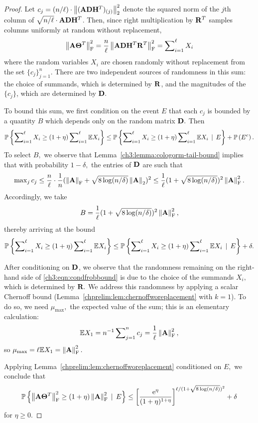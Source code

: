 \begin{proof}
Let $c_j = (n/\ell)\cdot\left\|(\mathbf{A} \mathbf{D} \mathbf{H}^T)_{(j)}\right\|_2^2$ denote the 
squared norm of the $j$th column of 
$\sqrt{n/\ell} \cdot \mathbf{A} \mathbf{D} \mathbf{H}^T$. Then, since right multiplication 
by $\mathbf{R}^T$ samples columns uniformly at random without replacement,
%
\begin{equation}
\label{ch3:eqn:frobenius-norm-upperbound}
 \left\|\mathbf{A} \mathbf{\Theta}^T\right\|_\mathrm{F}^2 = \frac{n}{\ell} 
 \left\|\mathbf{A} \mathbf{D} \mathbf{H}^T \mathbf{R}^T \right\|_\mathrm{F}^2 = \sum\nolimits_{i=1}^\ell X_i
\end{equation}
%
where the random variables $X_i$ are chosen randomly without replacement from
the set $\{c_j\}_{j=1}^n.$ There are two independent sources of randomness in
this sum: the choice of summands, which is determined by $\mathbf{R}$, and the 
magnitudes of the $\{c_j\}$, which are determined by $\mathbf{D}.$

To bound this sum, we first condition on the event $E$ that each $c_j$ is
bounded by a quantity $B$ which depends only on the random matrix $\mathbf{D}.$ Then
\[
\mathbb{P}\left\{\sum\nolimits_{i=1}^\ell X_i \geq (1 + \eta) \sum\nolimits_{i=1}^\ell 
\mathbb{E}{X_i} \right\} \leq \mathbb{P}\left\{\sum\nolimits_{i=1}^\ell X_i \geq (1 + \eta) \sum\nolimits_{i=1}^\ell \mathbb{E}{X_i} \,\mid\, E\right\} + \mbox{}{\mathbb{P}}\left(E^c\right).
\]
To select $B,$ we observe that Lemma~\ref{ch3:lemma:cologorm-tail-bound} 
implies that with probability $1 - \delta,$ the entries of $\mathbf{D}$ are such 
that
\[
 \max\nolimits_j c_j \leq \frac{n}{\ell} \cdot \frac{1}{n} 
 (\left\|\mathbf{A}\right\|_\mathrm{F} + \sqrt{8 \log(n/\delta)} \left\|\mathbf{A}\right\|_2)^2 \leq  
 \frac{1}{\ell} (1 + \sqrt{8 \log(n/\delta)})^2 \left\|\mathbf{A}\right\|_\mathrm{F}^2.
\]
Accordingly, we take
\[
 B = \frac{1}{\ell}(1 + \sqrt{8 \log(n/\delta)})^2 \left\|\mathbf{A}\right\|_\mathrm{F}^2,
\]
thereby arriving at the bound
\begin{equation}
\label{ch3:eqn:condfrobbound}
\mathbb{P}\left\{\sum\nolimits_{i=1}^\ell X_i \geq 
   (1 + \eta) \sum\nolimits_{i=1}^\ell \mathbb{E}{X_i} \right\} \leq 
   \mathbb{P}\left\{\sum\nolimits_{i=1}^\ell X_i \geq 
   (1 + \eta) \sum\nolimits_{i=1}^\ell \mathbb{E}{X_i} \,\mid\, E\right\} + \delta.
\end{equation}

After conditioning on $\mathbf{D}$, we observe that the randomness remaining on 
the right-hand side of \eqref{ch3:eqn:condfrobbound} is due to the choice of the 
summands $X_i,$ which is determined by $\mathbf{R}.$ We address this randomness by
applying a scalar Chernoff bound 
(Lemma~\ref{chprelim:lem:chernoffworeplacement} with $k=1$). To do so, we need 
$\mu_{\text{max}},$ the expected value of the sum; this is an elementary 
calculation:
\[
 \mathbb{E}{X_1} = n^{-1} \sum\nolimits_{j=1}^n c_j = \frac{1}{\ell} \left\|\mathbf{A}\right\|_\mathrm{F}^2,
\]
so $\mu_{\text{max}} = \ell \mathbb{E}{X_1} = \left\|\mathbf{A}\right\|_\mathrm{F}^2.$

Applying Lemma~\ref{chprelim:lem:chernoffworeplacement} conditioned on $E,$  we 
conclude that
\[
 \Prob{\FNormS{\matA \matTh\transp} \geq (1 + \eta) \FNormS{\matA}\,\mid\, E }
 \leq \left[ \frac{\expe^\eta}{(1+\eta)^{1+\eta}} \right]^%
 {\ell/(1 + \sqrt{8 \log(n/\delta)})^2} + \delta
\]
for $\eta \geq 0.$
\end{proof}

